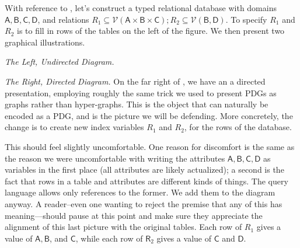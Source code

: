 \documentclass{article}
\theoremstyle{definition}
\theoremstyle{remark}
\newcommand{\var}[1]{\mathsf{#1}}
\begin{document}
\begin{example}
    With reference to , let's construct a typed relational database with domains $\var{A, B, C, D}$, and relations $R_1 \subseteq \mathcal V(\var{A\times B \times C}); R_2 \subseteq \mathcal V(\var{B, D})$. To specify $R_1$ and $R_2$ is to fill in rows of the tables on the left of the figure. We then present two graphical illustrations.
    
    \textit{The Left, Undirected Diagram.}

    

    

    
    \textit{The Right, Directed Diagram.} On the far right of , we have an a directed presentation, employing roughly the same trick we used to present PDGs as graphs rather than hyper-graphs. This is the object that can naturally be encoded as a PDG, and is the picture we will be defending. More concretely, the change is to create new index variables $R_1$ and $R_2$, for the rows of the database. 
    
    This should feel slightly uncomfortable. One reason for discomfort is the same as the reason we were uncomfortable with writing the attributes $\var{A,B,C,D}$ as variables in the first place (all attributes are likely actualized); a second is the fact that rows in a table and attributes are different kinds of things. The query language allows only references to the former. We add them to the diagram anyway.
    A reader--even one wanting to reject the premise that any of this has meaning---should pause at this point and make sure they appreciate the alignment of this last picture with the original tables. Each row of $R_1$ gives a value of $\var{A,B}$, and $\var C$, while each row of $\var R_2$ gives a value of $\var{C}$ and $\var D$. 
    

\end{example}
\end{document}
